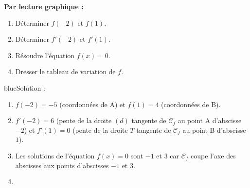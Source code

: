 \documentclass[10pt]{article}
\begin{document}
\textbf{Par lecture graphique :}
\begin{enumerate}
\item Déterminer $f(-2)$ et $f(1)$.
\item Déterminer $f'(-2)$ et $f'(1)$.
\item Résoudre l'équation $f(x)=0$.
\item Dresser le tableau de variation de $f$.
\end{enumerate}

\begin{color}{blue}Solution :\par
\begin{enumerate}
\item $f(-2) = -5$ (coordonnées de A) et $f(1) = 4$ (coordonnées de B).
\item $f'(-2) = 6$ (pente de la droite $(d)$ tangente de $\mathcal{C}_f$ au point A d'abscisse $-2$) et $f'(1) = 0$ (pente de la droite $T$ tangente de $\mathcal{C}_f$ au point B d'abscisse $1$).
\item Les solutions de l'équation $f(x)=0$ sont $-1$ et $3$ car $\mathcal{C}_f$ coupe l'axe des abscisses aux points d'abscisses  $-1$ et $3$.
\item \ {}


\end{enumerate}
\end{color}
\end{document}
